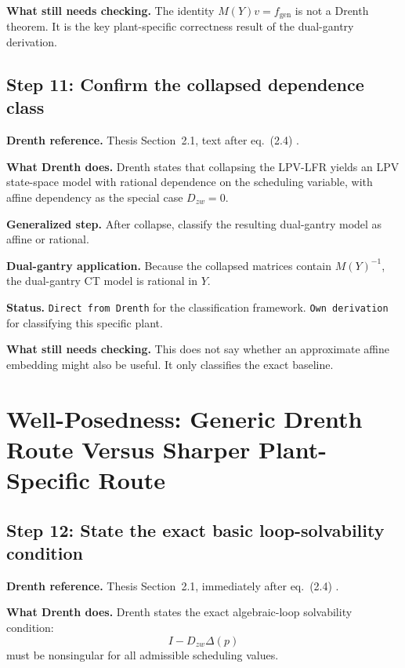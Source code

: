 ﻿\documentclass[11pt]{article}
\newcommand{\audititem}[2]{\par\smallskip\noindent\textbf{#1.} #2\par}
\newcommand{\statusline}[1]{\texttt{#1}}
\begin{document}
\audititem{What still needs checking}{The identity $M(Y)v = f_{\mathrm{gen}}$
is not a Drenth theorem. It is the key plant-specific correctness result of the
dual-gantry derivation.}

\subsection{Step 11: Confirm the collapsed dependence class}

\audititem{Drenth reference}{Thesis Section~2.1, text after eq.~(2.4)
\cite{drenth2025thesis}.}

\audititem{What Drenth does}{Drenth states that collapsing the LPV-LFR yields an
LPV state-space model with rational dependence on the scheduling variable, with
affine dependency as the special case $D_{zw}=0$.}

\audititem{Generalized step}{After collapse, classify the resulting dual-gantry
model as affine or rational.}

\audititem{Dual-gantry application}{Because the collapsed matrices contain
$M(Y)^{-1}$, the dual-gantry CT model is rational in $Y$.}

\audititem{Status}{\statusline{Direct from Drenth} for the classification
framework. \statusline{Own derivation} for classifying this specific plant.}

\audititem{What still needs checking}{This does not say whether an approximate
affine embedding might also be useful. It only classifies the exact baseline.}

\section{Well-Posedness: Generic Drenth Route Versus Sharper Plant-Specific Route}

\subsection{Step 12: State the exact basic loop-solvability condition}

\audititem{Drenth reference}{Thesis Section~2.1, immediately after eq.~(2.4)
\cite{drenth2025thesis}.}

\audititem{What Drenth does}{Drenth states the exact algebraic-loop solvability
condition:
\[
I - D_{zw}\Delta(p)
\]
must be nonsingular for all admissible scheduling values.}
\end{document}
